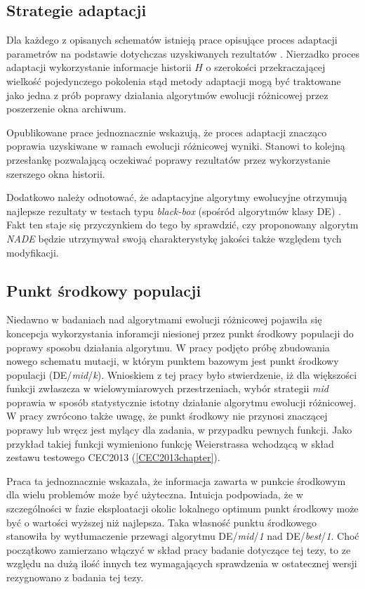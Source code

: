 \documentclass[12pt,a4paper]{report}
\begin{document}
{{{\subsection{Strategie adaptacji}
\label{Adaptation}
\par{
Dla każdego z opisanych schematów istnieją prace opisujące proces adaptacji parametrów na podstawie dotychczas uzyskiwanych rezultatów \cite{zhang2009adaptive,JADE,SHADE}. Nierzadko proces adaptacji wykorzystanie informacje historii $H$ o szerokości przekraczającej wielkość pojedynczego pokolenia stąd metody adaptacji mogą być traktowane jako jedna z prób poprawy działania algorytmów ewolucji różnicowej przez poszerzenie okna archiwum.
}
\par{
Opublikowane prace jednoznacznie wskazują, że proces adaptacji znacząco poprawia uzyskiwane w ramach ewolucji różnicowej wyniki. Stanowi to kolejną przesłankę pozwalającą oczekiwać poprawy rezultatów przez wykorzystanie szerszego okna historii.
}
\par{
Dodatkowo należy odnotować, że adaptacyjne algorytmy ewolucyjne otrzymują najlepsze rezultaty w testach typu \emph{black-box} (spośród algorytmów klasy DE) \cite{CEC2013Comp}. Fakt ten staje się przyczynkiem do tego by sprawdzić, czy proponowany algorytm \emph{NADE} będzie utrzymywał swoją charakterystykę jakości także względem tych modyfikacji.
}

\subsection{Punkt środkowy populacji}
\label{MidPoint}
\par{
Niedawno w badaniach nad algorytmami ewolucji różnicowej \cite{DEmid} pojawiła się koncepcja wykorzystania inforamcji niesionej przez punkt środkowy populacji do poprawy sposobu działania algorytmu. W pracy \cite{DEmid} podjęto próbę zbudowania nowego schematu mutacji, w którym punktem bazowym jest punkt środkowy populacji (DE/\emph{mid}/\emph{k}). Wnioskiem z tej pracy było stwierdzenie, iż dla większości funkcji zwłaszcza w wielowymiarowych przestrzeniach, wybór strategii \emph{mid} poprawia w sposób statystycznie istotny działanie algorytmu ewolucji różnicowej. W pracy zwrócono także uwagę, że punkt środkowy nie przynosi znaczącej poprawy lub wręcz jest mylący dla zadania, w przypadku pewnych funkcji. Jako przykład takiej funkcji wymieniono funkcję Weierstrassa wchodzącą w skład zestawu testowego CEC2013 (\ref{CEC2013chapter}).
}
\par{
Praca ta jednoznacznie wskazała, że informacja zawarta w punkcie środkowym dla wielu problemów może być użyteczna. Intuicja podpowiada, że w szczególności w fazie eksploatacji okolic lokalnego optimum punkt środkowy może być o wartości wyższej niż najlepsza. Taka własność punktu środkowego stanowiła by wytłumaczenie przewagi algorytmu DE/\emph{mid}/\emph{1} nad DE/\emph{best}/\emph{1}. Choć początkowo zamierzano włączyć w skład pracy badanie dotyczące tej tezy, to ze względu na dużą ilość innych tez wymagających sprawdzenia w ostatecznej wersji rezygnowano z badania tej tezy.
}
}}}
\end{document}

